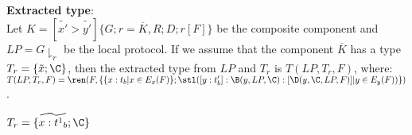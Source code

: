 \vspace{1cm}



\textbf{Extracted type}:\\


Let $K=[\tilde{x'}>\tilde{y'}]\{G;r=\overline{K},R;D;r[F]\}$ be the composite component and $LP=G\downharpoonright_r$ be the local protocol. If we assume that the component $\overline{K}$ has a type $T_r=\{\tilde{x};\C\}$, then the extracted type from $LP$ and $T_r$ is $T(LP,T_r,F)$, where: \\

$T(LP,T_r,F)=\ren(F,\{\{x:t_b|x\in E_x(F)\};\stl([y:t_b']:\B(y,LP,\C):[\D(y,\C,LP,F)]|y\in E_y(F)) \})$.
\hfill

$T_r=\{\widetilde{x:{t^1}_b};\C\}$

